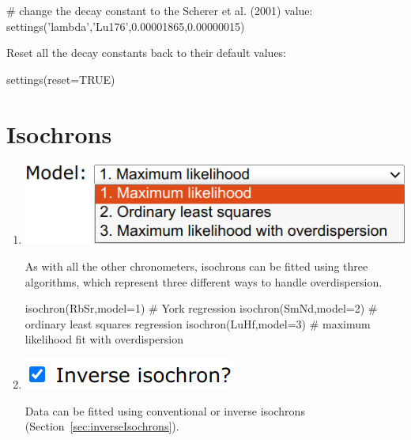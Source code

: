 \begin{refsection}
\begin{script}
# change the decay constant to the Scherer et al. (2001) value:
settings('lambda','Lu176',0.00001865,0.00000015)
\end{script}

Reset all the decay constants back to their default values:

\begin{console}
settings(reset=TRUE)
\end{console}

\section{Isochrons}\label{sec:PDisochrons}

\begin{enumerate}

\item\noindent\begin{minipage}[t]{.45\linewidth}
\strut\vspace*{-\baselineskip}\newline
\includegraphics[width=\linewidth]{../figures/PbPbIsochronModels.png}
\end{minipage}
\begin{minipage}[t]{.55\linewidth}
  As with all the other chronometers, isochrons can be fitted using
  three algorithms, which represent three different ways to handle
  overdispersion.
\end{minipage}

\begin{script}
isochron(RbSr,model=1) # York regression
isochron(SmNd,model=2) # ordinary least squares regression
isochron(LuHf,model=3) # maximum likelihood fit with overdispersion
\end{script}

\item\noindent\begin{minipage}[t]{.22\linewidth}
  \strut\vspace*{-1.2\baselineskip}\newline
  \includegraphics[width=\linewidth]{../figures/PbPbisochronInverse.png}
\end{minipage}
  \begin{minipage}[t]{.78\linewidth}
    Data can be fitted using conventional or inverse isochrons
    (Section~\ref{sec:inverseIsochrons}).
\end{minipage}


\end{enumerate}
\end{refsection}
